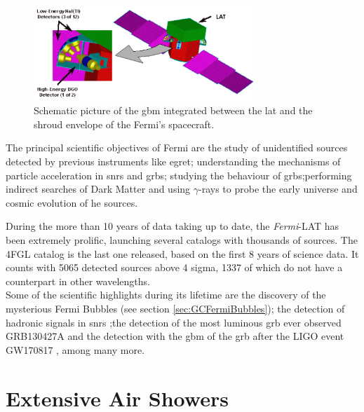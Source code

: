 \documentclass[main.tex]{subfiles}
\begin{document}
\begin{itemize}
    
    \begin{figure}
    \centering
    \includegraphics[width=0.75\textwidth]{Pictures/GBM.pdf}
    \caption{Schematic picture of the \gls{gbm} integrated between the \gls{lat} and the shroud envelope of the Fermi's spacecraft.}
    \label{fig:GBM}
    \end{figure}
    
\end{itemize}

The principal scientific objectives of Fermi are the study of unidentified sources detected by previous instruments like \gls{egret}; understanding the mechanisms of particle acceleration in \glspl{snr} and \glspl{grb}; studying the behaviour of \glspl{grb};performing indirect searches of Dark Matter and using $\gamma$-rays to probe the early universe and cosmic evolution of \gls{he} sources.

During the more than 10 years of data taking up to date, the \textit{Fermi}-LAT has been extremely prolific, launching several catalogs with thousands of sources. The 4FGL catalog is the last one released, based on the first 8 years of science data. It counts with 5065 detected sources above 4 sigma, 1337 of which do not have a counterpart in other wavelengths.\\
Some of the scientific highlights during its lifetime are the discovery of the mysterious Fermi Bubbles (see section \ref{sec:GCFermiBubbles}); the detection of hadronic signals in \glspl{snr} \cite{2013fermionSNRpiondecay};the detection of the most luminous \gls{grb} ever observed GRB130427A \cite{2014fermisuperGRB} and the detection with the \gls{gbm} of the \gls{grb} after the LIGO event GW170817 \cite{grb170817}, among many more. 

\section{Extensive Air Showers} \label{sec:eas}
\end{document}
